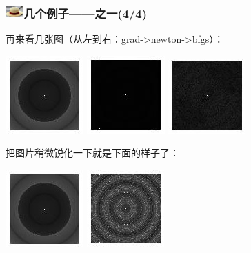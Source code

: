 \documentclass{beamer}
\begin{document}
\begin{frame}
\frametitle{\includegraphics[width=7mm,height=5mm]{Images/strawhat.jpg}几个例子——之一(4/4)}
再来看几张图（从左到右：grad->newton->bfgs）：\\
\vspace{-3mm}
\begin{center}
\includegraphics[width=0.23\linewidth]{Images/grad_hat.jpg}
\includegraphics[width=0.23\linewidth]{Images/newton_hat.jpg}
\includegraphics[width=0.23\linewidth]{Images/bfgs_hat.jpg}
\end{center}
\vspace{-3mm}
把图片稍微锐化一下就是下面的样子了：\\
\vspace{-3mm}
\begin{center}
\includegraphics[width=0.23\linewidth]{Images/grad_hat.jpg}
\includegraphics[width=0.23\linewidth]{Images/newton_hat_20.jpg}

\end{center}
\end{frame}
\end{document}
